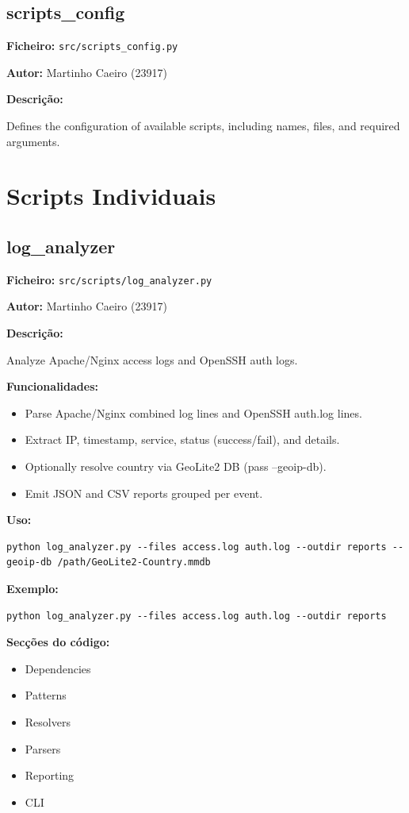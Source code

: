 \documentclass[a4paper,11pt]{article}
\begin{document}
\newpage
\subsection{scripts\_config}
\label{sec:scripts_config}

\textbf{Ficheiro:} \texttt{src/scripts\_config.py}

\textbf{Autor:} Martinho Caeiro (23917)

\textbf{Descrição:}

Defines the configuration of available scripts, including names, files,
and required arguments.

\newpage
\section{Scripts Individuais}

\subsection{log\_analyzer}
\label{sec:log_analyzer}

\textbf{Ficheiro:} \texttt{src/scripts/log\_analyzer.py}

\textbf{Autor:} Martinho Caeiro (23917)

\textbf{Descrição:}

Analyze Apache/Nginx access logs and OpenSSH auth logs.

\textbf{Funcionalidades:}
\begin{itemize}
    \item Parse Apache/Nginx combined log lines and OpenSSH auth.log lines.
    \item Extract IP, timestamp, service, status (success/fail), and details.
    \item Optionally resolve country via GeoLite2 DB (pass --geoip-db).
    \item Emit JSON and CSV reports grouped per event.
\end{itemize}

\textbf{Uso:}
\begin{verbatim}
python log_analyzer.py --files access.log auth.log --outdir reports --geoip-db /path/GeoLite2-Country.mmdb
\end{verbatim}

\textbf{Exemplo:}
\begin{verbatim}
python log_analyzer.py --files access.log auth.log --outdir reports
\end{verbatim}

\textbf{Secções do código:}
\begin{itemize}
    \item Dependencies
    \item Patterns
    \item Resolvers
    \item Parsers
    \item Reporting
    \item CLI
\end{itemize}
\end{document}
